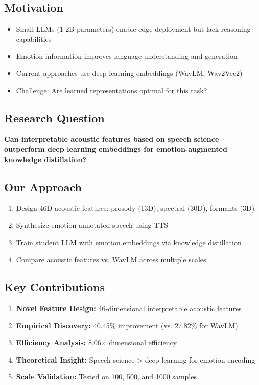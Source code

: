 
\subsection{Motivation}
\begin{itemize}
    \item Small LLMs (1-2B parameters) enable edge deployment but lack reasoning capabilities
    \item Emotion information improves language understanding and generation
    \item Current approaches use deep learning embeddings (WavLM, Wav2Vec2)
    \item Challenge: Are learned representations optimal for this task?
\end{itemize}

\subsection{Research Question}
\textbf{Can interpretable acoustic features based on speech science outperform deep learning embeddings for emotion-augmented knowledge distillation?}

\subsection{Our Approach}
\begin{enumerate}
    \item Design 46D acoustic features: prosody (13D), spectral (30D), formants (3D)
    \item Synthesize emotion-annotated speech using TTS
    \item Train student LLM with emotion embeddings via knowledge distillation
    \item Compare acoustic features vs. WavLM across multiple scales
\end{enumerate}

\subsection{Key Contributions}
\begin{enumerate}
    \item \textbf{Novel Feature Design:} 46-dimensional interpretable acoustic features
    \item \textbf{Empirical Discovery:} 40.45\% improvement (vs. 27.82\% for WavLM)
    \item \textbf{Efficiency Analysis:} 8.06$\times$ dimensional efficiency
    \item \textbf{Theoretical Insight:} Speech science > deep learning for emotion encoding
    \item \textbf{Scale Validation:} Tested on 100, 500, and 1000 samples
\end{enumerate}

